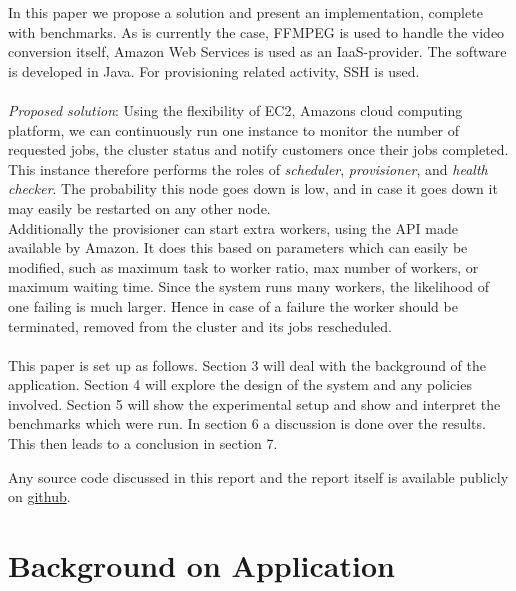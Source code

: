 \documentclass[a4paper]{IEEEtran}
\begin{document}
In this paper we propose a solution and present an implementation, complete with benchmarks.
As is currently the case, FFMPEG is used to handle the video conversion itself, Amazon Web Services is used as an IaaS-provider.
The software is developed in Java. For provisioning related activity, SSH is used.
\\
\\
\textit{Proposed solution}: Using the flexibility of EC2, Amazons cloud computing platform, we can continuously run one instance to monitor the number of requested jobs, the cluster status and notify customers once their jobs completed.
This instance therefore performs the roles of \textit{scheduler}, \textit{provisioner}, and \textit{health checker}.
The probability this node goes down is low, and in case it goes down it may easily be restarted on any other node.
\\
Additionally the provisioner can start extra workers, using the API made available by Amazon.
It does this based on parameters which can easily be modified, such as maximum task to worker ratio, max number of workers, or maximum waiting time.
Since the system runs many workers, the likelihood of one failing is much larger. 
Hence in case of a failure the worker should be terminated, removed from the cluster and its jobs rescheduled.
\\
\\
This paper is set up as follows.
Section 3 will deal with the background of the application.
Section 4 will explore the design of the system and any policies involved. 
Section 5 will show the experimental setup and show and interpret the benchmarks which were run.
In section 6 a discussion is done over the results.
This then leads to a conclusion in section 7.

Any source code discussed in this report and the report itself is available publicly on \href{https://github.com/snorberhuis/CloudComputing}{github}.

\section{Background on Application}
\end{document}
